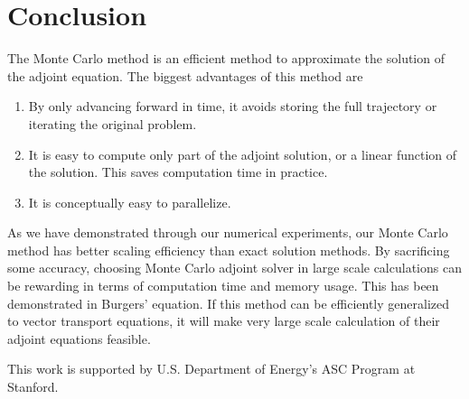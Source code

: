 \documentclass{elsart}
\theoremstyle{remark}
\theoremstyle{definition}
\theoremstyle{proof}
\begin{document}
\section{Conclusion}
    The Monte Carlo method is an efficient method to approximate the solution
    of the adjoint equation. The biggest advantages of this method are
    \begin{enumerate}
        \item By only advancing forward in time, it avoids storing the full
              trajectory or iterating the original problem.
        \item It is easy to compute only part of the adjoint solution, or a
              linear function of the solution. This saves computation time
              in practice.
        \item It is conceptually easy to parallelize.
    \end{enumerate}
    As we have demonstrated through our numerical experiments, our Monte
    Carlo method has better scaling efficiency than exact solution methods.
    By sacrificing some accuracy, choosing Monte Carlo adjoint solver in
    large scale calculations can be rewarding in terms of computation time
    and memory usage.  This has been demonstrated in Burgers' equation.
    If this method can be efficiently generalized to vector transport
    equations, it will make very large scale calculation of their adjoint
    equations feasible.



    \vspace{8mm}
    \noindent This work is supported by U.S. Department of Energy's ASC
              Program at Stanford.




\end{document}
